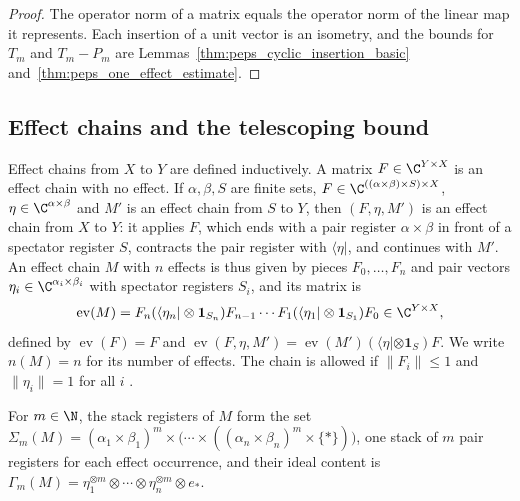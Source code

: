 \begin{proof}\leanok
    The operator norm of a matrix equals the operator norm of the linear map
    it represents. Each insertion of a unit vector is an isometry, and the
    bounds for $T_m$ and $T_m-P_m$ are
    Lemmas~\ref{thm:peps_cyclic_insertion_basic}
    and~\ref{thm:peps_one_effect_estimate}.
\end{proof}

\subsection{Effect chains and the telescoping bound}
\label{sec:party_effect_chains}

\begin{definition}
    \label{def:party_effect_chain}
    \leanok
    Effect chains from $X$ to $Y$ are defined inductively. A matrix
    $F\in\C^{Y\times X}$ is an effect chain with no effect. If $\alpha,\beta,S$
    are finite sets, $F\in\C^{((\alpha\times\beta)\times S)\times X}$,
    $\eta\in\C^{\alpha\times\beta}$ and $M'$ is an effect chain from $S$ to
    $Y$, then $(F,\eta,M')$ is an effect chain from $X$ to $Y$: it applies
    $F$, which ends with a pair register $\alpha\times\beta$ in front of a
    spectator register $S$, contracts the pair register with $\langle\eta|$,
    and continues with $M'$. An effect chain $M$ with $n$ effects is thus
    given by pieces $F_0,\dots,F_n$ and pair vectors
    $\eta_i\in\C^{\alpha_i\times\beta_i}$ with spectator registers $S_i$,
    and its matrix is
    \begin{align}
        \operatorname{ev}(M)
        =F_n(\langle\eta_n|\otimes\mathbf 1_{S_n})F_{n-1}\cdots
        F_1(\langle\eta_1|\otimes\mathbf 1_{S_1})F_0\in\C^{Y\times X},
        \label{eq:party_effect_chain}
    \end{align}
    defined by $\operatorname{ev}(F)=F$ and
    $\operatorname{ev}(F,\eta,M')
        =\operatorname{ev}(M')(\langle\eta|\otimes\mathbf 1_S)F$. We write
    $n(M)=n$ for its number of effects. The chain is allowed if
    $\lVert F_i\rVert\le1$ and $\lVert\eta_i\rVert=1$ for all $i$
    \cite[Section~5.1]{OpenAI2026PolynomialPEPS}.

    For $m\in\N$, the stack registers of $M$ form the set
    $\Sigma_m(M)=(\alpha_1\times\beta_1)^m\times\bigl(\cdots\times
        ((\alpha_n\times\beta_n)^m\times\{*\})\bigr)$, one stack of $m$ pair
    registers for each effect occurrence, and their ideal content is
    $\Gamma_m(M)=\eta_1^{\otimes m}\otimes\cdots\otimes\eta_n^{\otimes m}
        \otimes e_*$.
\end{definition}

